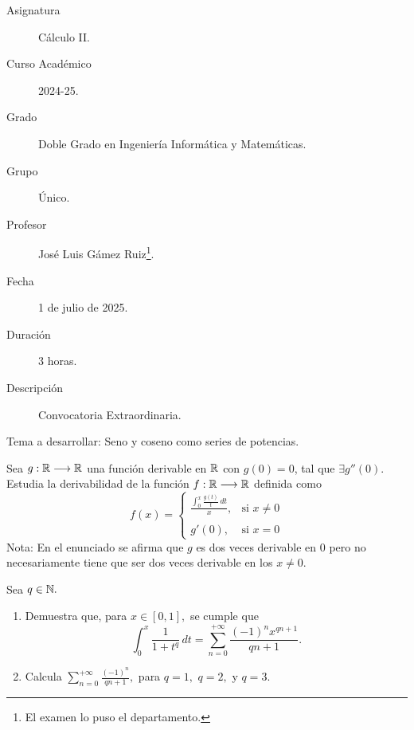 \documentclass[12pt]{article}
\begin{document}
	
	
	
	
	
	\begin{description}
		\item[Asignatura] Cálculo II.
		\item[Curso Académico] 2024-25.
		\item[Grado] Doble Grado en Ingeniería Informática y Matemáticas.
		\item[Grupo] Único.
		\item[Profesor] José Luis Gámez Ruiz\footnote{El examen lo puso el departamento.}.
		\item[Fecha] 1 de julio de 2025.
		\item[Duración] 3 horas.
		\item[Descripción] Convocatoria Extraordinaria.
	\end{description}
	\newpage
	
	\begin{ejercicio}[2 puntos]
		Tema a desarrollar: Seno y coseno como series de potencias.
	\end{ejercicio}
	
	\begin{ejercicio}[2 puntos]
		Sea $g:\mathbb{R}\longrightarrow\mathbb{R}$ una función derivable en $\mathbb{R}$ con $g(0)=0$, tal que $\exists g''(0)$. Estudia la derivabilidad de la función $f:\mathbb{R}\longrightarrow\mathbb{R}$ definida como \\
		$$ f(x) = 
		\begin{cases}
			\displaystyle \frac{\int_{0}^{x} \frac{g(t)}{t}\,dt}{x}, & \text{si } x \neq 0 \\
			\\
			g'(0), & \text{si } x = 0
		\end{cases}$$
		Nota: En el enunciado se afirma que $g$ es dos veces derivable en 0 pero no necesariamente tiene que ser dos veces derivable en los $x \neq 0$.
	\end{ejercicio}
	
	\begin{ejercicio}[2 puntos]
		Sea $q \in \mathbb{N}.$
		\begin{enumerate}[label=\alph*)]
			\item Demuestra que, para $x \in [0, 1],$ se cumple que 
			$$ \int_{0}^{x} \frac{1}{1 + t^q} \, dt = \sum_{n=0}^{+\infty} \frac{(-1)^n x^{qn+1}}{qn+1}.$$
			 \item Calcula $\displaystyle \sum_{n=0}^{+\infty} \frac{(-1)^n}{qn+1},$ para $q=1,$ $q=2,$ y $q=3.$
		\end{enumerate}
	\end{ejercicio}
	
\end{document}

